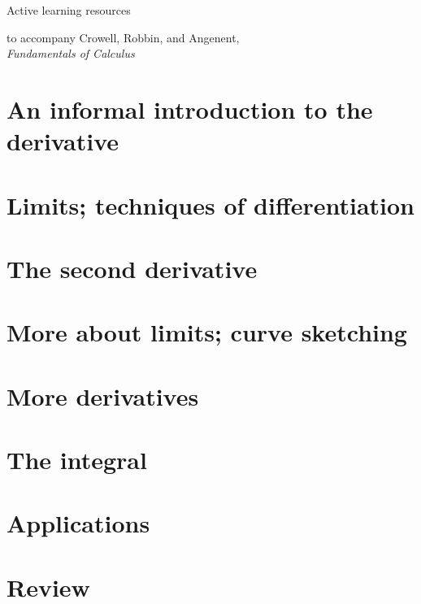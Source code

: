 \documentclass{beamer}
\begin{document}
\newcommand{\der}{\operatorname{d\!}{}}

\newcommand{\mygamma}{\textup{\textgamma}}



\begin{frame}{Active learning resources}

to accompany Crowell, Robbin, and Angenent,\\
 \emph{Fundamentals of Calculus}

\end{frame}

\tableofcontents

\section{An informal introduction to the derivative}






\section{Limits; techniques of differentiation}




\section{The second derivative}


\section{More about limits; curve sketching}



\section{More derivatives}


\section{The integral}


\section{Applications}


\section{Review}

\end{document}
